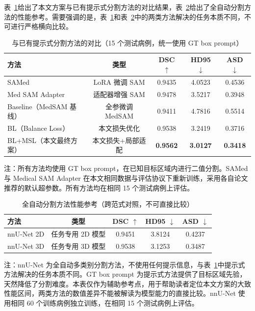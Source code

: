表~\ref{tab:comparison_prompt}给出了本文方案与已有提示式分割方法的对比结果，表~\ref{tab:comparison_auto}给出了全自动分割方法的性能参考。需要强调的是，表~\ref{tab:comparison_prompt}和表~\ref{tab:comparison_auto}中的两类方法解决的任务本质不同，不可进行严格横向比较。

\begin{table}[htbp]
  \centering
  \caption{与已有提示式分割方法的对比（15 个测试病例，统一使用 GT box prompt）}
  \label{tab:comparison_prompt}
  \small
  \begin{tabular}{lcccc}
    \hline
    方法 & 类型 & DSC $\uparrow$ & HD95 $\downarrow$ & ASD $\downarrow$ \\
    \hline
    SAMed\cite{zhang2024samed}            & LoRA 微调 SAM     & 0.9435 & 4.0523 & 0.4536 \\
    Med SAM Adapter\cite{wu2023medsamadapter} & 适配器增强 SAM & 0.9478 & 3.5217 & 0.3948 \\
    Baseline（MedSAM 基线）               & 全参微调 MedSAM    & 0.9411 & 4.7816 & 0.5514 \\
    BL（Balance Loss）                    & 本文损失优化       & 0.9538 & 3.2419 & 0.3716 \\
    BL+MSL（本文最终方案）                 & 本文损失+局部适配   & \textbf{0.9562} & \textbf{3.0127} & \textbf{0.3418} \\
    \hline
  \end{tabular}
  \vspace{2pt}
  \parbox{\textwidth}{\footnotesize 注：所有方法均使用 GT box prompt，在已知目标区域内进行二值分割。SAMed 与 Medical SAM Adapter 在本文相同数据与评估协议下重新训练，采用各自论文推荐的默认超参数。所有方法均在相同 15 个测试病例上评估。}
\end{table}

\begin{table}[htbp]
  \centering
  \caption{全自动分割方法性能参考（跨范式对照，不可直接比较）}
  \label{tab:comparison_auto}
  \small
  \begin{tabular}{lcccc}
    \hline
    方法 & 类型 & DSC $\uparrow$ & HD95 $\downarrow$ & ASD $\downarrow$ \\
    \hline
    nnU-Net 2D\cite{isensee2021nnunet}    & 任务专用 2D 模型  & 0.9451 & 3.8124 & 0.4237 \\
    nnU-Net 3D\cite{isensee2021nnunet}    & 任务专用 3D 模型  & 0.9538 & 3.1253 & 0.3487 \\
    \hline
  \end{tabular}
  \vspace{2pt}
  \parbox{\textwidth}{\footnotesize 注：nnU-Net 为全自动多类别分割方法，不使用任何提示信息，与表~\ref{tab:comparison_prompt}中提示式方法解决的任务本质不同。GT box prompt 为提示式方法提供了目标区域先验，天然降低了分割难度。本表仅作为辅助参考点，用于帮助读者定位本文方案的大致性能区间，两类方法的数值差异不能被解读为模型能力的直接比较。nnU-Net 使用相同 60 个训练病例独立训练，在相同 15 个测试病例上评估。}
\end{table}

